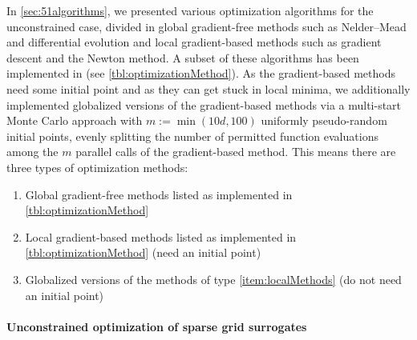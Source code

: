 In \cref{sec:51algorithms}, we presented various optimization algorithms
for the unconstrained case,
divided in global gradient-free methods such as Nelder--Mead and
differential evolution and local gradient-based methods such as
gradient descent and the Newton method.
A subset of these algorithms has been implemented in \sgpp
(see \cref{tbl:optimizationMethod}).
As the gradient-based methods need some initial point and
as they can get stuck in local minima,
we additionally implemented globalized versions of the gradient-based methods
via a multi-start Monte Carlo approach with $m := \min(10d, 100)$
uniformly pseudo-random initial points, evenly splitting the number of
permitted function evaluations among the $m$ parallel calls of the
gradient-based method.
This means there are three types of optimization methods:

\begin{enumerate}[label={(T\arabic*)},leftmargin=*]
  \item
  \label{item:globalMethods}
  Global gradient-free methods listed as implemented in
  \cref{tbl:optimizationMethod}
  
  \item
  \label{item:localMethods}
  Local gradient-based methods listed as implemented in
  \cref{tbl:optimizationMethod} (need an initial point)
  
  \item
  \label{item:globalizedMethods}
  Globalized versions of the methods of type \ref{item:localMethods}
  (do not need an initial point)
\end{enumerate}

\paragraph{Unconstrained optimization of sparse grid surrogates}

